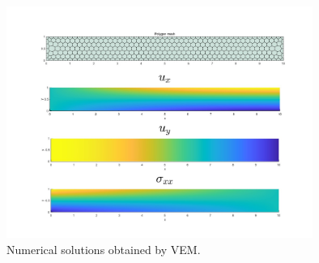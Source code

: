 \documentclass[kulak]{kulakarticle} %
\begin{document}
\begin{figure}[htbp]
	\centering
	\includegraphics[width=10cm]{r5_s2_exam1C.jpg}
	\caption{Numerical solutions obtained by VEM.}
	\label{r5.s2.f2}
\end{figure}






\end{document}
